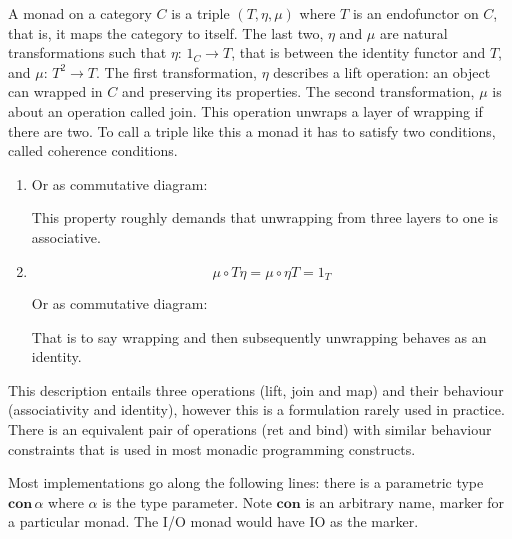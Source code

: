 \documentclass[12pt,twoside,notitlepage]{report}
\begin{document}
A monad on a category $ C $ is a triple $ (T, \eta, \mu) $ where $ T $ is an endofunctor on $ C $, that is, it maps the category to itself. The last two, $ \eta $ and $ \mu $ are natural transformations such that $ \eta:\, 1_C \rightarrow T $, that is between the identity functor and $ T $, and $ \mu:\, T^2 \rightarrow T $. The first transformation, $ \eta $ describes a lift operation: an object can wrapped in $ C $ and preserving its properties. The second transformation, $ \mu $ is about an operation called join. This operation unwraps a layer of wrapping if there are two. To call a triple like this a monad it has to satisfy two conditions, called coherence conditions.
\begin{enumerate}

\item{
\iftoggle{wordcount}{}{
\[ \mu \circ T \mu = \mu \circ \mu T \]
}
Or as commutative diagram:
\begin{center}
\end{center}
This property roughly demands that unwrapping from three layers to one is associative.



}
\item{
\[ \mu \circ T\eta = \mu \circ \eta T = 1_T \]

Or as commutative diagram:
\begin{center}
\end{center}

That is to say wrapping and then subsequently unwrapping behaves as an identity.
}
\end{enumerate}

This description entails three operations (lift, join and map) and their behaviour (associativity and identity), however this is a formulation rarely used in practice. There is an equivalent pair of operations (ret and bind) with similar behaviour constraints that is used in most monadic programming constructs. 


Most implementations go along the following lines: there is a parametric type $ \textbf{con} \, \alpha $ where $ \alpha $ is the type parameter. Note $ \textbf{con} $ is an arbitrary name, marker for a particular monad. The I/O monad would have IO as the marker.
\end{document}
